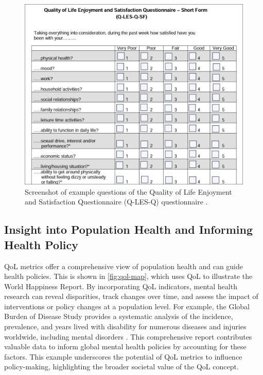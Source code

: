 \documentclass[10pt]{article}
\begin{document}
\begin{sloppypar}
  \begin{figure}[ht]
    \centering
    \includegraphics[width=\textwidth]{figures/q-les.png}
    \caption[Screenshot of example questions of the Quality of Life Enjoyment and Satisfaction Questionnaire (Q-LES-Q) questionnaire.]{Screenshot of example questions of the Quality of Life Enjoyment and Satisfaction Questionnaire (Q-LES-Q) questionnaire \citep{endicott_quality_1993}.}
    \label{fig:q-les}
  \end{figure}

  \subsection{Insight into Population Health and Informing Health Policy}
  \label{subsec:population-health}
  QoL metrics offer a comprehensive view of population health and can guide health policies. This is shown in \autoref{fig:qol-map}, which uses QoL to illustrate the World Happiness Report. By incorporating QoL indicators, mental health research can reveal disparities, track changes over time, and assess the impact of interventions or policy changes at a population level.
  For example, the Global Burden of Disease Study \citeyearpar{gbd_2017_disease_and_injury_incidence_and_prevalence_collaborators_global_2018} provides a systematic analysis of the incidence, prevalence, and years lived with disability for numerous diseases and injuries worldwide, including mental disorders \citep{gbd_2017_disease_and_injury_incidence_and_prevalence_collaborators_global_2018}. This comprehensive report contributes valuable data to inform global mental health policies by accounting for these factors. This example underscores the potential of QoL metrics to influence policy-making, highlighting the broader societal value of the QoL concept.


\end{sloppypar}
\end{document}
